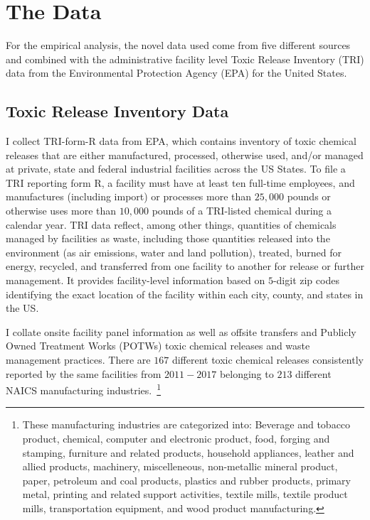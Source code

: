 \documentclass{C:/Users/david/OneDrive/Documents/ULMS/PhD/Thesis/chapter3/src/climate_change/latex/Economic_Journal/OUP-EJ}
\begin{document}
    \section{The Data}\label{sec:data}
    For the empirical analysis, the novel data used come from five different sources and combined with the administrative facility level Toxic Release Inventory (TRI) data from the Environmental Protection Agency (EPA) for the United States.

    \subsection{Toxic Release Inventory Data}\label{subsec:toxic-release-inventory-data}
    I collect TRI-form-R data from EPA, which contains inventory of toxic chemical releases that are either manufactured, processed, otherwise used, and/or managed at private, state and federal industrial facilities across the US States. To file a TRI reporting form R, a facility must have at least ten full-time employees, and manufactures (including import) or processes more than $25,000$ pounds or otherwise uses more than $10,000$ pounds of a TRI-listed chemical during a calendar year. TRI data reflect, among other things, quantities of chemicals managed by facilities as waste, including those quantities released into the environment (as air emissions, water and land pollution), treated, burned for energy, recycled, and transferred from one facility to another for release or further management. It provides facility-level information based on $5$-digit zip codes identifying the exact location of the facility within each city, county, and states in the US.

    I collate onsite facility panel information as well as offsite transfers and Publicly Owned Treatment Works (POTWs) toxic chemical releases and waste management practices. There are $167$ different toxic chemical releases consistently reported by the same facilities from $2011-2017$ belonging to $213$ different NAICS manufacturing industries.~\footnote{\tiny These manufacturing industries are categorized into: Beverage and tobacco product, chemical, computer and electronic product, food, forging and stamping, furniture and related products, household appliances, leather and allied products, machinery, miscelleneous, non-metallic mineral product, paper, petroleum and coal products, plastics and rubber products, primary metal, printing and related support activities, textile mills, textile product mills, transportation equipment, and wood product manufacturing.}
\end{document}
